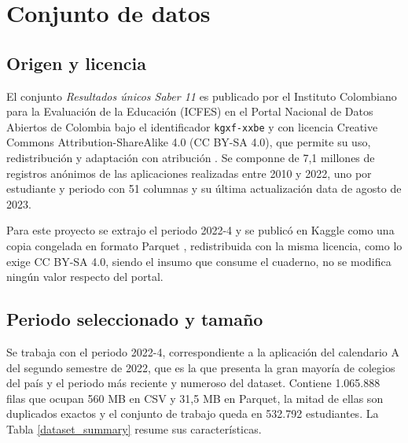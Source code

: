 \section{Conjunto de datos}
    \subsection{Origen y licencia}
        El conjunto \textit{Resultados únicos Saber 11} es publicado por el
        Instituto Colombiano para la Evaluación de la Educación (ICFES) en el
        Portal Nacional de Datos Abiertos de Colombia bajo el identificador
        \texttt{kgxf-xxbe} y con licencia Creative Commons Attribution-ShareAlike
        4.0 (CC BY-SA 4.0), que permite su uso, redistribución y adaptación con
        atribución \cite{icfes2023resultados}. Se componne de 7,1 millones de 
        registros anónimos de las aplicaciones realizadas entre 2010 y 2022, 
        uno por estudiante y periodo con 51 columnas y su última actualización 
        data de agosto de 2023.

        \vspace{10pt}

        Para este proyecto se extrajo el periodo 2022-4 y se publicó en
        Kaggle como una copia congelada en formato Parquet 
        \cite{rubiano2026kaggle}, redistribuida con la misma licencia, como lo
        exige CC BY-SA 4.0, siendo el insumo que consume el cuaderno, no se 
        modifica ningún valor respecto del portal.

    \subsection{Periodo seleccionado y tamaño}
        Se trabaja con el periodo 2022-4, correspondiente a la aplicación del
        calendario A del segundo semestre de 2022, que es la que presenta la gran
        mayoría de colegios del país y el periodo más reciente y numeroso del
        dataset. Contiene 1.065.888 filas que ocupan 560 MB en CSV y 31,5 MB en
        Parquet, la mitad de ellas son duplicados exactos y el conjunto de trabajo 
        queda en 532.792 estudiantes. La Tabla \ref{dataset_summary} resume sus 
        características.

